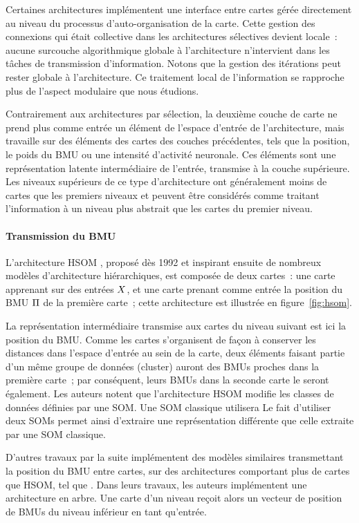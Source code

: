 \documentclass[../main]{subfiles}
\begin{document}
Certaines architectures implémentent une interface entre cartes gérée directement au niveau du processus d'auto-organisation de la carte.
Cette gestion des connexions qui était collective dans les architectures sélectives devient locale~: aucune surcouche algorithmique globale à l'architecture n'intervient dans les tâches de transmission d'information. Notons que la gestion des itérations peut rester globale à l'architecture.
Ce traitement local de l'information se rapproche plus de l'aspect modulaire que nous étudions.

Contrairement aux architectures par sélection, la deuxième couche de carte ne prend plus comme entrée un élément de l'espace d'entrée de l'architecture, mais travaille sur des éléments des cartes des couches précédentes, tels que la position, le poids du BMU ou une intensité d'activité neuronale. 
Ces éléments sont une représentation latente intermédiaire de l'entrée, transmise à la couche supérieure. Les niveaux supérieurs de ce type d'architecture ont généralement moins de cartes que les premiers niveaux et peuvent être considérés comme traitant l'information à un niveau plus abstrait que les cartes du premier niveau.

\paragraph*{Transmission du BMU}
L'architecture  HSOM \cite{lampinen_clustering_1992}, proposé dès 1992 et inspirant ensuite de nombreux modèles d'architecture hiérarchiques, est composée de deux cartes~: une carte apprenant sur des entrées $X$, et une carte prenant comme entrée la position du BMU $\Pi$ de la première carte~; cette architecture est illustrée en figure~\ref{fig:hsom}. 

La représentation intermédiaire transmise aux cartes du niveau suivant est ici la position du BMU.
Comme les cartes s'organisent de façon à conserver les distances dans l'espace d'entrée au sein de la carte, deux éléments faisant partie d'un même groupe de données (cluster) auront des BMUs proches dans la première carte~; par conséquent, leurs BMUs dans la seconde carte le seront également. 
Les auteurs notent que l'architecture HSOM modifie les classes de données définies par une SOM. Une SOM classique utilisera 
Le fait d'utiliser deux SOMs permet ainsi d'extraire une représentation différente que celle extraite par une SOM classique.

D'autres travaux par la suite implémentent des modèles similaires transmettant la position du BMU entre cartes, sur des architectures comportant plus de cartes que HSOM, tel que \cite{hagenauer_hierarchical_2013, Paplinski2005MultimodalFS}. Dans leurs travaux, les auteurs implémentent une architecture en arbre. Une carte d'un niveau reçoit alors un vecteur de position de BMUs du niveau inférieur en tant qu'entrée.
\end{document}
